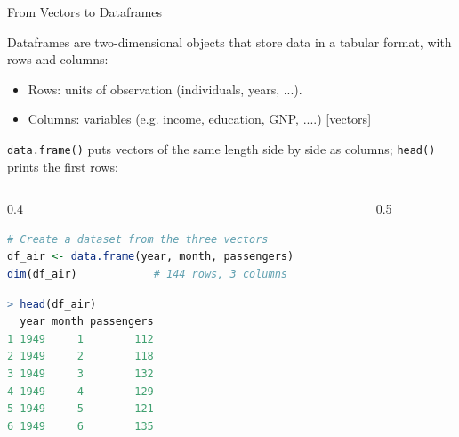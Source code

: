 \documentclass[9pt,aspectratio=169]{beamer}
\begin{document}
\begin{frame}[fragile]{From Vectors to Dataframes}
\linespread{1.3}\selectfont %

Dataframes are two-dimensional objects that store data in a tabular format, with rows and columns:
\begin{itemize}
  \item Rows: units of observation (individuals, years, ...).
  \item Columns: variables (e.g. income, education, GNP, ....) [vectors]
\end{itemize}
\pause
\texttt{data.frame()} puts vectors of the same length side by side as columns; \texttt{head()} prints the first rows:

\begin{columns}[c]
  \begin{column}{0.4\textwidth}
\begin{lstlisting}[language=R, basicstyle=\ttfamily\tiny]
# Create a dataset from the three vectors
df_air <- data.frame(year, month, passengers)
dim(df_air)            # 144 rows, 3 columns
\end{lstlisting}
\begin{lstlisting}[language=R, basicstyle=\ttfamily\tiny]
> head(df_air)
  year month passengers
1 1949     1        112
2 1949     2        118
3 1949     3        132
4 1949     4        129
5 1949     5        121
6 1949     6        135
\end{lstlisting}
  \end{column}
  \begin{column}{0.5\textwidth}
  \centering
  \end{column}
\end{columns}

\end{frame}
\end{document}
